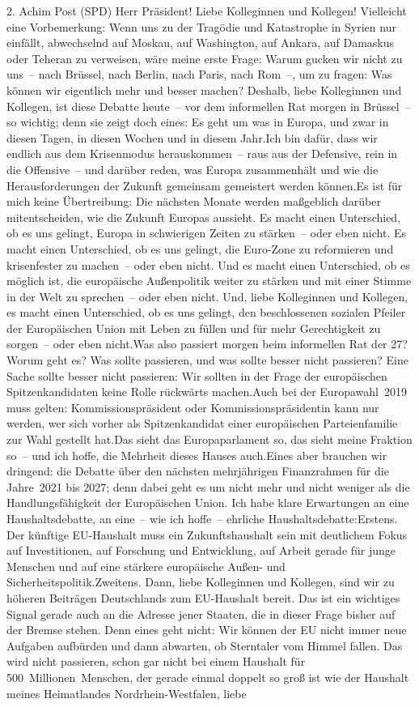\documentclass{article}
\begin{document}
	2. Achim Post (SPD) Herr Präsident! Liebe Kolleginnen und Kollegen! Vielleicht eine Vorbemerkung: Wenn uns zu der Tragödie und Katastrophe in Syrien nur einfällt, abwechselnd auf Moskau, auf Washington, auf Ankara, auf Damaskus oder Teheran zu verweisen, wäre meine erste Frage: Warum gucken wir nicht zu uns – nach Brüssel, nach Berlin, nach Paris, nach Rom –, um zu fragen: Was können wir eigentlich mehr und besser machen? Deshalb, liebe Kolleginnen und Kollegen, ist diese Debatte heute – vor dem informellen Rat morgen in Brüssel – so wichtig; denn sie zeigt doch eines: Es geht um was in Europa, und zwar in diesen Tagen, in diesen Wochen und in diesem Jahr.Ich bin dafür, dass wir endlich aus dem Krisenmodus herauskommen – raus aus der Defensive, rein in die Offensive – und darüber reden, was Europa zusammenhält und wie die Herausforderungen der Zukunft gemeinsam gemeistert werden können.Es ist für mich keine Übertreibung: Die nächsten Monate werden maßgeblich darüber mitentscheiden, wie die Zukunft Europas aussieht. Es macht einen Unterschied, ob es uns gelingt, Europa in schwierigen Zeiten zu stärken – oder eben nicht. Es macht einen Unterschied, ob es uns gelingt, die Euro-Zone zu reformieren und krisenfester zu machen – oder eben nicht. Und es macht einen Unterschied, ob es möglich ist, die europäische Außenpolitik weiter zu stärken und mit einer Stimme in der Welt zu sprechen – oder eben nicht. Und, liebe Kolleginnen und Kollegen, es macht einen Unterschied, ob es uns gelingt, den beschlossenen sozialen Pfeiler der Europäischen Union mit Leben zu füllen und für mehr Gerechtigkeit zu sorgen – oder eben nicht.Was also passiert morgen beim informellen Rat der 27? Worum geht es? Was sollte passieren, und was sollte besser nicht passieren? Eine Sache sollte besser nicht passieren: Wir sollten in der Frage der europäischen Spitzenkandidaten keine Rolle rückwärts machen.Auch bei der Europawahl 2019 muss gelten: Kommissionspräsident oder Kommissionspräsidentin kann nur werden, wer sich vorher als Spitzenkandidat einer europäischen Parteienfamilie zur Wahl gestellt hat.Das sieht das Europaparlament so, das sieht meine Fraktion so – und ich hoffe, die Mehrheit dieses Hauses auch.Eines aber brauchen wir dringend: die Debatte über den nächsten mehrjährigen Finanzrahmen für die Jahre 2021 bis 2027; denn dabei geht es um nicht mehr und nicht weniger als die Handlungsfähigkeit der Europäischen Union. Ich habe klare Erwartungen an eine Haushaltsdebatte, an eine – wie ich hoffe – ehrliche Haushaltsdebatte:Erstens. Der künftige EU-Haushalt muss ein Zukunftshaushalt sein mit deutlichem Fokus auf Investitionen, auf Forschung und Entwicklung, auf Arbeit gerade für junge Menschen und auf eine stärkere europäische Außen- und Sicherheitspolitik.Zweitens. Dann, liebe Kolleginnen und Kollegen, sind wir zu höheren Beiträgen Deutschlands zum EU-Haushalt bereit. Das ist ein wichtiges Signal gerade auch an die Adresse jener Staaten, die in dieser Frage bisher auf der Bremse stehen. Denn eines geht nicht: Wir können der EU nicht immer neue Aufgaben aufbürden und dann abwarten, ob Sterntaler vom Himmel fallen. Das wird nicht passieren, schon gar nicht bei einem Haushalt für 500 Millionen Menschen, der gerade einmal doppelt so groß ist wie der Haushalt meines Heimatlandes Nordrhein-Westfalen, liebe 
\end{document}
